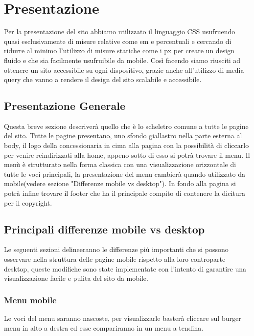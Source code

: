 \section{Presentazione}
    Per la presentazione del sito abbiamo utilizzato il linguaggio CSS usufruendo quasi esclusivamente di misure relative come em e percentuali e cercando di ridurre al minimo l'utilizzo di misure statiche come i px per creare un design fluido e che sia facilmente usufruibile da mobile.
    Così facendo siamo riusciti ad ottenere un sito accessibile su ogni dispositivo, grazie anche all'utilizzo di media query che vanno a rendere il design del sito scalabile e accessibile.
    
    \subsection{Presentazione Generale}
    Questa breve sezione descriverà quello che è lo scheletro comune a tutte le pagine del sito.
    Tutte le pagine presentano, uno sfondo giallastro nella parte esterna al body, il logo della concessionaria in cima alla pagina con la possibilità di cliccarlo per venire reindirizzati alla home, appeno sotto di esso si potrà trovare il menu. Il menù è strutturato nella forma classica con una visualizzazione orizzontale di tutte le voci principali, la presentazione del menu cambierà quando utilizzato da mobile(vedere sezione "Differenze mobile vs desktop"). In fondo alla pagina si potrà infine trovare il footer che ha il principale compito di contenere la dicitura per il copyright.

    \subsection{Principali differenze mobile vs desktop}
    Le seguenti sezioni delineeranno le differenze più importanti che si possono osservare nella struttura delle pagine mobile rispetto alla loro controparte desktop, queste modifiche sono state implementate con l'intento di garantire una visualizzazione facile e pulita del sito da mobile.

        \subsubsection{Menu mobile}
        Le voci del menu saranno nascoste, per visualizzarle basterà cliccare sul burger menu in alto a destra ed esse compariranno in un menu a tendina.

